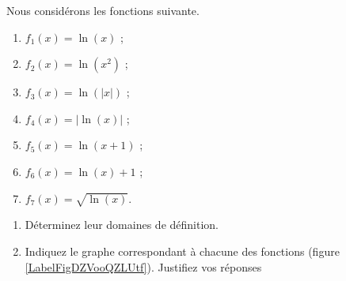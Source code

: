 
\begin{exercice}\label{exoanalyseCTU-0009}

Nous considérons les fonctions suivante.
\begin{multicols}{3}
  \begin{enumerate}
  \item $f_1(x)=\ln(x)$ ;
  \item $f_2(x)=\ln(x^2)$ ;
  \item $f_3(x)=\ln(|x|)$ ;
  \item $f_4(x)=|\ln(x)|$ ;
  \item $f_5(x)=\ln(x+1)$ ;
  \item $f_6(x)=\ln(x)+1$ ;
  \item $f_7(x)=\sqrt{\ln(x)}$.
  \end{enumerate}
\end{multicols}

\newcommand{\CaptionFigDZVooQZLUtf}{Les graphes à considérer}


\begin{enumerate}
\item Déterminez leur domaines de définition.
\item Indiquez le graphe correspondant à chacune des fonctions (figure \ref{LabelFigDZVooQZLUtf}). Justifiez vos réponses
\end{enumerate}



\end{exercice}
